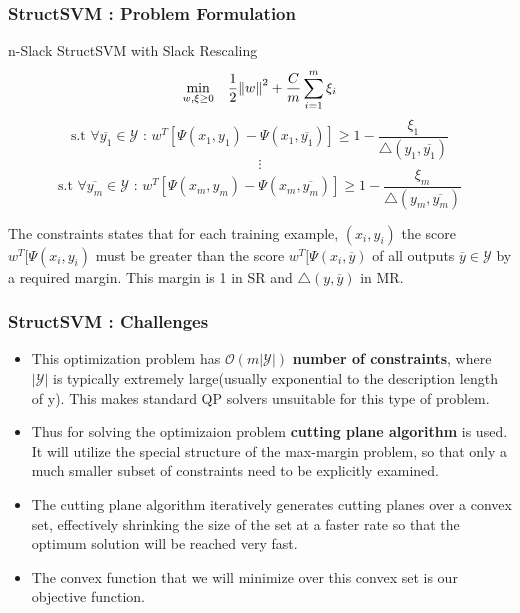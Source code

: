 \documentclass{beamer}
\begin{document}
\begin{frame}
\frametitle{StructSVM : Problem Formulation}
\begin{block}{n-Slack StructSVM with Slack Rescaling}
\[\underset{w, \xi \geq 0}{\min} \quad \frac{1}{2} \norm{w}^2 + \frac{C}{m} \sum_{i=1}^m \xi_i \]
\[ \textrm{s.t } \forall \overline{y_1} \in \mathcal{Y} \textrm{  :  } w^T[\Psi(x_1, y_1) - \Psi(x_1, \overline{y_1})] \geq 1 - \frac{\xi_1}{\bigtriangleup(y_1, \overline{y_1})} \]
\[ \vdots \]
\[ \textrm{s.t } \forall \overline{y_m} \in \mathcal{Y} \textrm{  :  } w^T[\Psi(x_m, y_m) - \Psi(x_m, \overline{y_m})] \geq 1 - \frac{\xi_m}{\bigtriangleup(y_m, \overline{y_m})} \]
\end{block}
The constraints states that for each training example, $(x_i, y_i)$ the score $w^T[\Psi(x_i, y_i)$ must be greater than the score $w^T[\Psi(x_i, \overline{y})$ of all outputs $\overline{y} \in \mathcal{Y}$ by a required margin. This margin is 1 in SR and $\bigtriangleup(y, \overline{y})$ in MR.
\end{frame}


\begin{frame}
\frametitle{StructSVM : Challenges}
\begin{itemize}
\item This optimization problem has $\mathcal{O}(m|\mathcal{Y}|)$ \textbf{number of constraints}, where $|\mathcal{Y}|$ is typically extremely large(usually exponential to the description length of y). This makes standard QP solvers unsuitable for this type of problem.

\item Thus for solving the optimizaion problem \textbf{cutting plane algorithm} is used. It will utilize the special structure of the max-margin problem, so that only a much smaller subset of constraints need to be explicitly examined.

\item The cutting plane algorithm iteratively generates cutting planes over a convex set, effectively shrinking the size of the set at a faster rate so that the optimum solution will be reached very fast.

\item The convex function that we will minimize over this convex set is our objective function.
\end{itemize}

\end{frame}
\end{document}

